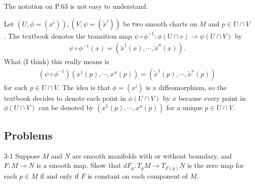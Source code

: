 \begin{rem}
  The notation on P.63 is not easy to understand.

  Let $(U, \phi = (x^i)), (V, \psi = (\tilde{x}^i))$ be two smooth charts on $M$ and $p \in U \cap V$.
  The textbook denotes the transition map $\psi \circ \phi^{-1}: \phi(U \cap v) \rightarrow \psi(U \cap V)$ by
  \begin{align*}
    \psi \circ \phi^{-1}(x) = (\tilde{x}^1(x), \cdots, \tilde{x}^n(x)).
  \end{align*}
  What (I think) this really means is
  \begin{align*}
    (\psi \circ \phi^{-1})(x^1(p), \cdots, x^n(p)) = (\tilde{x}^1(p), \cdots, \tilde{x}^n(p))
  \end{align*}
  for each $p \in U \cap V$.
  The idea is that $\phi = (x^i)$ is a diffeomorphism, so the textbook decides to denote each point in $\phi(U \cap V)$ by $x$ because every point in $\phi(U \cap V)$ can be denoted by $(x^1(p), \cdots, x^n(p))$ for a unique $p \in U \cap V$.
\end{rem}

\subsection{Problems}

\begin{customprob}{3-1}
  Suppose $M$ and $N$ are smooth manifolds with or without boundary, and $F: M \rightarrow N$ is a smooth map.
  Show that $dF_p: T_pM \rightarrow T_{F(p)}N$ is the zero map for each $p \in M$ if and only if $F$ is constant on each component of $M$.
\end{customprob}

